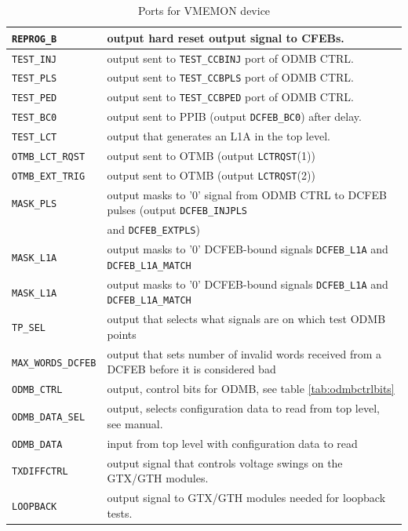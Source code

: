 \documentclass[10pt,a4paper]{article}
\begin{document}
\begin{table}[H]
\begin{tabular}{|l|l|}
\texttt{REPROG\_B}& output hard reset output signal to CFEBs.\\ \hline
\texttt{TEST\_INJ}& output sent to \texttt{TEST\_CCBINJ} port of ODMB CTRL. \\ \hline
\texttt{TEST\_PLS}& output sent to \texttt{TEST\_CCBPLS} port of ODMB CTRL. \\ \hline
\texttt{TEST\_PED}& output sent to \texttt{TEST\_CCBPED} port of ODMB CTRL. \\ \hline
\texttt{TEST\_BC0}& output sent to PPIB (output \texttt{DCFEB\_BC0}) after delay. \\ \hline
\texttt{TEST\_LCT}& output that generates an L1A in the top level. \\ \hline
\texttt{OTMB\_LCT\_RQST}& output sent to OTMB (output \texttt{LCTRQST}(1)) \\ \hline
\texttt{OTMB\_EXT\_TRIG}& output sent to OTMB (output \texttt{LCTRQST}(2)) \\ \hline
\texttt{MASK\_PLS}& output masks to '0' signal from ODMB CTRL to DCFEB pulses (output \texttt{DCFEB\_INJPLS}\\ 
                  & and \texttt{DCFEB\_EXTPLS}) \\ \hline
\texttt{MASK\_L1A}& output masks to '0' DCFEB-bound signals \texttt{DCFEB\_L1A} and \texttt{DCFEB\_L1A\_MATCH} \\ \hline
\texttt{MASK\_L1A}& output masks to '0' DCFEB-bound signals \texttt{DCFEB\_L1A} and \texttt{DCFEB\_L1A\_MATCH} \\ \hline
\texttt{TP\_SEL}& output that selects what signals are on which test ODMB points \\ \hline
\texttt{MAX\_WORDS\_DCFEB}& output that sets number of invalid words received from a DCFEB before it is considered bad\\ \hline
\texttt{ODMB\_CTRL}& output, control bits for ODMB, see table \ref{tab:odmbctrlbits}\\ \hline
\texttt{ODMB\_DATA\_SEL}& output, selects configuration data to read from top level, see manual.\\ \hline
\texttt{ODMB\_DATA}& input from top level with configuration data to read\\ \hline
\texttt{TXDIFFCTRL}& output signal that controls voltage swings on the GTX/GTH modules.\\ \hline
\texttt{LOOPBACK}& output signal to GTX/GTH modules needed for loopback tests.\\ \hline
\end{tabular}
\caption{Ports for VMEMON device}
\label{tab:vmemoninterface}
\end{table}
\end{document}

